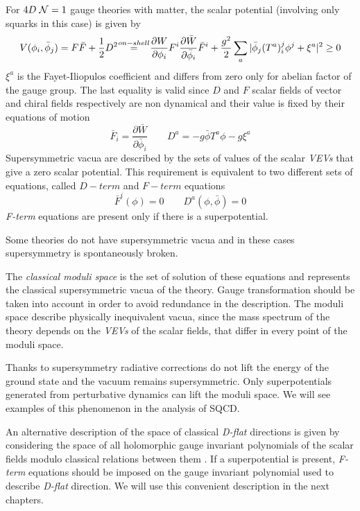 For $4D \; \mathcal{N}=1$ gauge theories with matter, the scalar potential (involving only squarks in this case) is given by
\begin{equation}
 V ( \phi_i, \bar{\phi}_j) = F \bar{F} + \frac{1}{2} D^2  \quad \overset{\mathclap{on-shell}}=   \quad \frac{\partial W}{\partial \phi_i} F^i \frac{\partial \bar{W}} {\partial \bar{\phi}_i} \bar{F}^i + \frac{g^2}{2} \sum_a | \bar{\phi}_j (T^a)^j_i \phi^j + \xi^a | ^2  \geq 0
\end{equation} 
$\xi^a$ is the Fayet-Iliopulos coefficient and differs from zero only for abelian factor of the gauge group.
The last equality is valid since $D$ and $F$ scalar fields of vector and chiral fields respectively are non dynamical and 
their value is fixed by their equations of motion
\begin{equation}
 \bar{F}_i  = \frac{\partial \bar{W}} {\partial \bar{\phi}_i} \qquad D^a = - g \bar{\phi} T^a \phi - g \xi^a 
\end{equation}
Supersymmetric vacua are described by the sets of values of the scalar \emph{VEVs} that give a zero scalar potential. 
This requirement is equivalent to two different sets of equations, called $D-term$ and $F-term $ equations
\begin{equation}
\bar{F}^i ( \phi) = 0 \qquad D^a (\phi , \bar{\phi}) = 0
\end{equation}
\emph{F-term} equations are present only if there is a superpotential.

Some theories do not have supersymmetric vacua and in these cases supersymmetry is spontaneously broken. 

The \emph{classical moduli space} is the set of solution of these equations and represents the classical supersymmetric vacua of the theory. 
Gauge transformation should be taken into account in order to avoid redundance in the description.
The moduli space describe physically inequivalent vacua, since the mass spectrum of the theory depends on the \emph{VEVs} of the scalar fields, that differ in every point of the moduli space. 

Thanks to supersymmetry radiative corrections do not lift the energy of the ground state and the vacuum remains supersymmetric.
Only superpotentials generated from perturbative dynamics can lift the moduli space. 
We will see examples of this phenomenon in the analysis of SQCD.

An alternative description of the space of classical \emph{D-flat} directions is given by considering the space of all holomorphic gauge invariant polynomials of the scalar fields modulo classical relations between them \cite{Luty:1995sd}. 
If a superpotential is present, \emph{F-term} equations should be imposed on the gauge invariant polynomial used to describe \emph{D-flat} direction.
We will use this convenient description in the next chapters.



